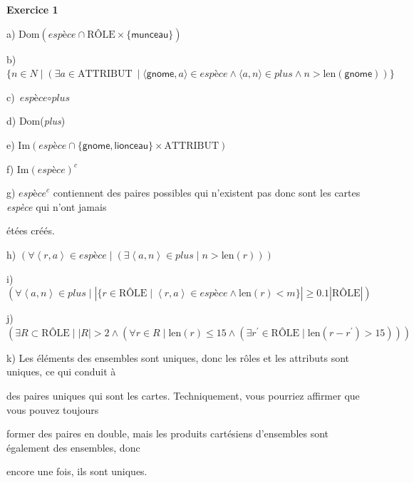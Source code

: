 \documentclass{article}
\newcommand{\role}{\mbox{RÔLE}}
\newcommand{\attribut}{\mbox{ATTRIBUT}}
\newcommand{\compose}{\circ}
\newcommand{\tuple}[1]{\ensuremath{\left\langle #1 \right\rangle}}
\begin{document}
\textbf{Exercice 1}

a) $\text{Dom}(\textit{espèce} \cap \role \times \{ \textsf{munceau} \} )$

\vspace{0.5cm}

b) $\{ n \in N \mid (\exists a \in \attribut\ \mid \langle \textsf{gnome},a  \rangle \in \textit{espèce} \land \langle a,n \rangle \in \textit{plus} \land n > \text{len}(\textsf{gnome}) )\}$

\vspace{0.5cm}

c) $\textit{espèce} \compose \textit{plus}$ 

\vspace{0.5cm}

d) Dom(\textit{plus})

\vspace{0.5cm}

e) $ \text{Im}(\textit{espèce} \cap \{ \textsf{gnome}, \textsf{lionceau} \} \times \attribut)$

\vspace{0.5cm}

f) $ \text{Im}(\textit{espèce})^{c} $

\vspace{0.5cm}

g) $\textit{espèce}^{c}$ contiennent des paires possibles qui n'existent pas donc sont les cartes \textit{espèce} qui n'ont jamais 

étées créés. 

\vspace{0.5cm}

h) $( \forall \tuple{r,a} \in \textit{espèce} \mid ( \exists \tuple{a,n} \in \textit{plus} \mid n > \text{len}(r) ))$

\vspace{0.5cm}

i) $ (  \forall \tuple{a,n} \in \textit{plus} \mid |\{ r \in \role \mid \tuple{r,a} \in \textit{espèce} \land \text{len}(r) < m \}| \geq 0.1 | \role | ) $

\vspace{0.5cm}

j) $( \exists R \subset \role \mid |R| > 2 \land ( \forall r \in R \mid \text{len}(r) \leq 15 \land ( \exists r^{\prime} \in \role \mid \text{len}(r - r^{\prime}) > 15 ) ) ) $

\vspace{0.5cm}

k) Les éléments des ensembles sont uniques, donc les rôles et les attributs sont uniques, ce qui conduit à

des paires uniques qui sont les cartes. Techniquement, vous pourriez affirmer que vous pouvez toujours 

former des paires en double, mais les produits cartésiens d'ensembles sont également des ensembles, donc 

encore une fois, ils sont uniques.
\end{document}
